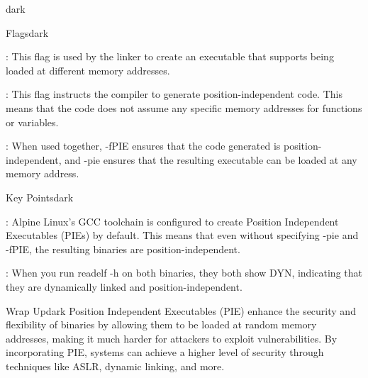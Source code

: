 \begin{baseBoxThree}{}{dark}
    \smallskip
    \begin{baseBoxThree}{Flags}{dark}
        \smallskip
        \begin{posnexItemize}
            \item[\sA] :  This flag is used by the linker to create an executable that supports being loaded at different memory addresses.
            \item[\sA] : This flag instructs the compiler to generate position-independent code. This means that the code does not assume any specific memory addresses for functions or variables.
            \item[\sA] : When used together, -fPIE ensures that the code generated is position-independent, and -pie ensures that the resulting executable can be loaded at any memory address.
        \end{posnexItemize}
        \smallskip
    \end{baseBoxThree}
    \smallskip
    \begin{baseBoxThree}{Key Points}{dark}
        \smallskip
        \begin{posnexItemize}
            \item[\sA] : Alpine Linux's GCC toolchain is configured to create Position Independent Executables (PIEs) by default. This means that even without specifying -pie and -fPIE, the resulting binaries are position-independent.
            \item[\sA] : When you run readelf -h on both binaries, they both show DYN, indicating that they are dynamically linked and position-independent.
        \end{posnexItemize}
        \smallskip
    \end{baseBoxThree}
    \smallskip
    \begin{baseBoxThree}{Wrap Up}{dark}
        \smallskip
            Position Independent Executables (PIE) enhance the security and flexibility of binaries by allowing them to be loaded at random memory addresses, making it much harder for attackers to exploit vulnerabilities. By incorporating PIE, systems can achieve a higher level of security through techniques like ASLR, dynamic linking, and more.
        \smallskip
    \end{baseBoxThree}
    \smallskip
\end{baseBoxThree}
